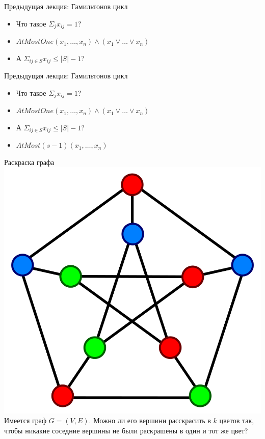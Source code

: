 \documentclass{beamer}
\begin{document}
\begin{frame}{Предыдущая лекция: Гамильтонов цикл}
\begin{itemize}
\item Что такое $\Sigma_{j} x_{ij} = 1$?
\item $AtMostOne(x_1, \dots, x_n) \wedge (x_1 \vee \dots \vee x_n)$
\item А $\Sigma_{ij \in S} x_{ij} \le |S| - 1$?
\end{itemize}
\end{frame}

\begin{frame}{Предыдущая лекция: Гамильтонов цикл}
\begin{itemize}
\item Что такое $\Sigma_{j} x_{ij} = 1$?
\item $AtMostOne(x_1, \dots, x_n) \wedge (x_1 \vee \dots \vee x_n)$
\item А $\Sigma_{ij \in S} x_{ij} \le |S| - 1$?
\item $AtMost(s - 1)(x_1, \dots, x_n)$
\end{itemize}
\end{frame}

\begin{frame}{Раскраска графа}
\includegraphics[scale=0.1]{graph-coloring.svg.png}
Имеется граф $G = (V, E)$. Можно ли его вершини расскрасить в $k$ цветов так, чтобы никакие соседние вершины не были раскрашены
в один и тот же цвет?
\end{frame}
\end{document}
